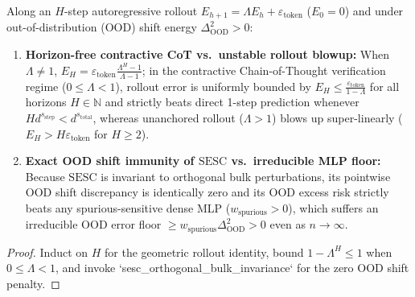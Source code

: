 \begin{lemma}\label{lem:autoregressive_ood}
\leanok
{}
Along an $H$-step autoregressive rollout $E_{h+1} = \Lambda E_h + \varepsilon_{\mathrm{token}}$ ($E_0 = 0$) and under out-of-distribution (OOD) shift energy $\Delta_{\mathrm{OOD}}^2 > 0$:
\begin{enumerate}
\item \textbf{Horizon-free contractive CoT vs.\ unstable rollout blowup:} When $\Lambda \ne 1$, $E_H = \varepsilon_{\mathrm{token}}\frac{\Lambda^H - 1}{\Lambda - 1}$; in the contractive Chain-of-Thought verification regime ($0 \le \Lambda < 1$), rollout error is uniformly bounded by $E_H \le \frac{\varepsilon_{\mathrm{token}}}{1-\Lambda}$ for all horizons $H \in \mathbb{N}$ and strictly beats direct 1-step prediction whenever $H d^{s_{\mathrm{step}}} < d^{s_{\mathrm{total}}}$, whereas unanchored rollout ($\Lambda > 1$) blows up super-linearly ($E_H > H\varepsilon_{\mathrm{token}}$ for $H \ge 2$).
\item \textbf{Exact OOD shift immunity of $\mathrm{SESC}$ vs.\ irreducible MLP floor:} Because $\mathrm{SESC}$ is invariant to orthogonal bulk perturbations, its pointwise OOD shift discrepancy is identically zero and its OOD excess risk strictly beats any spurious-sensitive dense MLP ($w_{\mathrm{spurious}} > 0$), which suffers an irreducible OOD error floor $\ge w_{\mathrm{spurious}}\Delta_{\mathrm{OOD}}^2 > 0$ even as $n \to \infty$.
\end{enumerate}
\end{lemma}
\begin{proof}
\leanok
Induct on $H$ for the geometric rollout identity, bound $1 - \Lambda^H \le 1$ when $0 \le \Lambda < 1$, and invoke `sesc_orthogonal_bulk_invariance` for the zero OOD shift penalty.
\end{proof}

